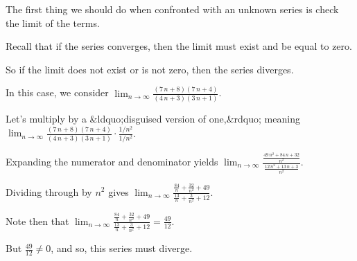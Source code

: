 \documentclass{ximera}
\begin{document}
\begin{question}
  \begin{solution}
    \begin{hint}
      The first thing we should do when confronted with an unknown series is check the limit of the terms.
    \end{hint}
    \begin{hint}
      Recall that if the series converges, then the limit must exist and be equal to zero.
    \end{hint}
    \begin{hint}
      So if the limit does not exist or is not zero, then the series diverges.
    \end{hint}
    \begin{hint}
      In this case, we consider \(\displaystyle\lim_{n \to \infty} \displaystyle\frac{{\left(7 \, n + 8\right)} {\left(7 \, n + 4\right)}}{{\left(4 \, n + 3\right)} {\left(3 \, n + 1\right)}}\).
    \end{hint}
    \begin{hint}
      Let's multiply by a &ldquo;disguised version of one,&rdquo; meaning \(\displaystyle\lim_{n \to \infty} \displaystyle\frac{{\left(7 \, n + 8\right)} {\left(7 \, n + 4\right)}}{{\left(4 \, n + 3\right)} {\left(3 \, n + 1\right)}} \cdot \displaystyle\frac{1/n^{2}}{1/n^{2}}\).
    \end{hint}
    \begin{hint}
      Expanding the numerator and denominator yields \(\displaystyle\lim_{n \to \infty} \displaystyle\frac{\displaystyle\frac{49 \, n^{2} + 84 \, n + 32}{n^{2}}}{\displaystyle\frac{12 \, n^{2} + 13 \, n + 3}{n^{2}}}\).
    \end{hint}
    \begin{hint}
      Dividing through by \(n^{2}\) gives \(\displaystyle\lim_{n \to \infty} \displaystyle\frac{\displaystyle\frac{84}{n} + \displaystyle\frac{32}{n^{2}} + 49}{\displaystyle\frac{13}{n} + \displaystyle\frac{3}{n^{2}} + 12}\).
    \end{hint}
    \begin{hint}
      Note then that \(\displaystyle\lim_{n \to \infty} \displaystyle\frac{\displaystyle\frac{84}{n} + \displaystyle\frac{32}{n^{2}} + 49}{\displaystyle\frac{13}{n} + \displaystyle\frac{3}{n^{2}} + 12} = \displaystyle\frac{49}{12}\).
    \end{hint}
    \begin{hint}
      But \(\displaystyle\frac{49}{12} \neq 0\), and so, this series must diverge.
      
    \end{hint}
    
    
    \begin{multiple-choice}
      
    \end{multiple-choice}
    
  \end{solution}
\end{question}
\end{document}
